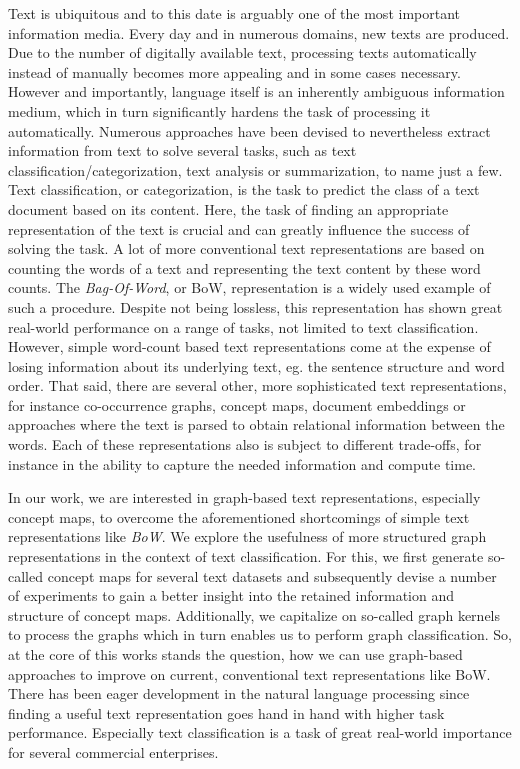 Text is ubiquitous and to this date is arguably one of the most important information media.
Every day and in numerous domains, new texts are produced.
Due to the number of digitally available text, processing texts automatically instead of manually becomes more appealing and in some cases necessary.
However and importantly, language itself is an inherently ambiguous information medium, which in turn significantly hardens the task of processing it automatically.
Numerous approaches have been devised to nevertheless extract information from text to solve several tasks, such as text classification/categorization, text analysis or summarization, to name just a few.
Text classification, or categorization, is the task to predict the class of a text document based on its content.
Here, the task of finding an appropriate representation of the text is crucial and can greatly influence the success of solving the task.
A lot of more conventional text representations are based on counting the words of a text and representing the text content by these word counts.
The \textit{Bag-Of-Word}, or BoW, representation is a widely used example of such a procedure.
Despite not being lossless, this representation has shown great real-world performance on a range of tasks, not limited to text classification.
However, simple word-count based text representations come at the expense of losing information about its underlying text, eg. the sentence structure and word order.
That said, there are several other, more sophisticated text representations, for instance 
 co-occurrence graphs, concept maps, document embeddings or approaches where the text is parsed to obtain relational information between the words.
Each of these representations also is subject to different trade-offs, for instance in the ability to capture the needed information and compute time.

In our work, we are interested in graph-based text representations, especially concept maps, to overcome the aforementioned shortcomings of simple text representations like \textit{BoW}.
We explore the usefulness of more structured graph representations in the context of text classification.
For this, we first generate so-called concept maps for several text datasets and subsequently devise a number of experiments to gain a better insight into the retained information and structure of concept maps.
Additionally, we capitalize on so-called graph kernels to process the graphs which in turn enables us to perform graph classification.
So, at the core of this works stands the question, how we can use graph-based approaches to improve on current, conventional text representations like BoW.
There has been eager development in the natural language processing since finding a useful text representation goes hand in hand with higher task performance.
Especially text classification is a task of great real-world importance for several commercial enterprises.

